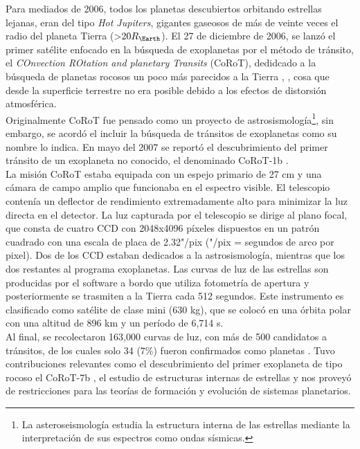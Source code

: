 Para mediados de 2006, todos los planetas descubiertos orbitando estrellas lejanas, eran del tipo \textit{Hot Jupiters}, gigantes gaseosos de más de veinte veces el radio del planeta Tierra (>$20R_{\Earth}$). El 27 de diciembre de 2006, se lanzó el primer satélite enfocado en la búsqueda de exoplanetas por el método de tránsito, el \textit{COnvection ROtation and planetary Transits} (CoRoT), dedidcado a la búsqueda de planetas rocosos un poco más parecidos a la Tierra \cite{aigrain2007corot}, \cite{barge2007corot}, cosa que desde la superficie terrestre no era posible debido a los efectos de distorsión atmosférica.\\

Originalmente CoRoT fue pensado como un proyecto de astrosismología\footnote{La asteroseismología estudia la estructura interna de las estrellas mediante la interpretación de sus espectros como ondas sísmicas.}, sin embargo, se acordó el incluir la búsqueda de tránsitos de exoplanetas como su nombre lo indica. En mayo del 2007 se reportó el descubrimiento del primer tránsito de un exoplaneta no conocido, el denominado CoRoT-1b \cite{barge2008transiting}. \\

La misión CoRoT estaba equipada con un espejo primario de 27 cm  y una cámara de campo amplio que funcionaba en el espectro visible. El telescopio contenía un deflector de rendimiento extremadamente alto para minimizar la luz directa en el detector. La luz capturada por el telescopio se dirige al plano focal, que consta de cuatro CCD con 2048x4096 píxeles dispuestos en un patrón cuadrado con una escala de placa de 2.32"/pix ("/pix = segundos de arco por pixel). Dos de los CCD estaban dedicados a la astrosismología, mientras que los dos restantes al programa exoplanetas. Las curvas de luz de las estrellas son producidas por el software a bordo que utiliza fotometría de apertura y posteriormente se trasmiten a la Tierra cada 512 segundos. Este instrumento es clasificado como satélite de clase mini (630 kg), que se colocó en una órbita polar con una altitud de 896 km y un período de 6,714 s.\\

Al final, se recolectaron 163,000 curvas de luz, con más de 500 candidatos a tránsitos, de los cuales solo 34 (7\%) fueron confirmados como planetas \cite{moutou2013corot}. Tuvo contribuciones relevantes como el descubrimiento del primer exoplaneta de tipo rocoso el CoRoT-7b \cite{leger2009transiting}, el estudio de estructuras internas de estrellas y nos proveyó de restricciones para las teorías de formación y evolución de sistemas planetarios.

